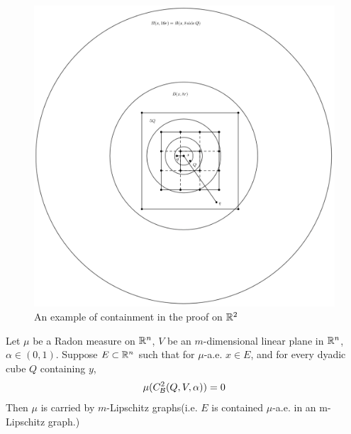 \begin{figure}[H]
    \centering
    \includegraphics[width=.56\textwidth]{images/doubleMucube.png}
    \caption{An example of containment in the proof on $\mathbb{R}^2$}
\end{figure}


\begin{lemma}\label{lemma:CBQ2=0-carried}
    Let $\mu$ be a Radon measure on $\mathbb{R}^n$, $V$ be an $m$-dimensional linear plane in $\mathbb{R}^n$, $\alpha\in(0,1)$. Suppose $E\subset \mathbb{R}^n$ such that for $\mu$-a.e. $x\in E$, and for every dyadic cube $Q$ containing $y$, 
    \begin{equation}\label{eq:muB2Q=0}
        \mu(C_\mathcal B^2(Q, V, \alpha)) = 0
    \end{equation}
    Then $\mu$ is carried by $m$-Lipschitz graphs(i.e. $E$ is contained $\mu$-a.e. in an m-Lipschitz graph.)
\end{lemma}

